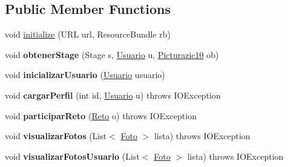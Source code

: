 \subsection*{Public Member Functions}
\begin{DoxyCompactItemize}
\item 
void \mbox{\hyperlink{classpicturazic1_1_1_controlador_principal_aceb559cae1605639bcf18d28c48fa738}{initialize}} (U\+RL url, Resource\+Bundle rb)
\item 
\mbox{\label{classpicturazic1_1_1_controlador_principal_a0f901b475d9d579f91b6553ff24f7989}} 
void {\bfseries obtener\+Stage} (Stage s, \mbox{\hyperlink{classmodelo_1_1_usuario}{Usuario}} u, \mbox{\hyperlink{classpicturazic1_1_1_picturazic10}{Picturazic10}} ob)
\item 
\mbox{\label{classpicturazic1_1_1_controlador_principal_a25a24ea8169d64e2521ba7fbe0ad3be4}} 
void {\bfseries inicializar\+Usuario} (\mbox{\hyperlink{classmodelo_1_1_usuario}{Usuario}} usuario)
\item 
\mbox{\label{classpicturazic1_1_1_controlador_principal_a96871e61884a5b0ad647b9637d60eb0f}} 
void {\bfseries cargar\+Perfil} (int id, \mbox{\hyperlink{classmodelo_1_1_usuario}{Usuario}} u)  throws I\+O\+Exception 
\item 
\mbox{\label{classpicturazic1_1_1_controlador_principal_a51c6c72cac7befd2d89ba1d7c15afc25}} 
void {\bfseries participar\+Reto} (\mbox{\hyperlink{classmodelo_1_1_reto}{Reto}} o)  throws I\+O\+Exception 
\item 
\mbox{\label{classpicturazic1_1_1_controlador_principal_ae8ce2539007dd9d05f9d766c7818bfb1}} 
void {\bfseries visualizar\+Fotos} (List$<$ \mbox{\hyperlink{classmodelo_1_1_foto}{Foto}} $>$ lista)  throws I\+O\+Exception 
\item 
\mbox{\label{classpicturazic1_1_1_controlador_principal_ac62cbb41a2404c86d838c399a8d00ee7}} 
void {\bfseries visualizar\+Fotos\+Usuario} (List$<$ \mbox{\hyperlink{classmodelo_1_1_foto}{Foto}} $>$ lista)  throws I\+O\+Exception 
\item 

\end{DoxyCompactItemize}
